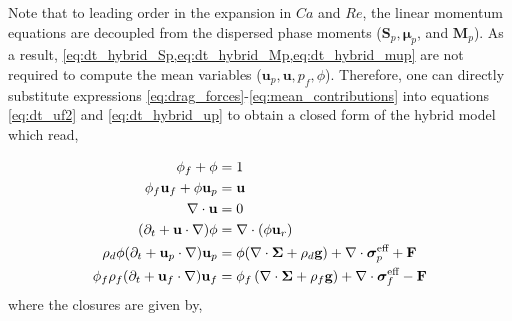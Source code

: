 Note that to leading order in the expansion in $Ca$ and $Re$, the linear momentum equations are decoupled from the dispersed phase moments ($\textbf{S}_p, \bm{\mu}_p$, and $\textbf{M}_p$).
As a result, \ref{eq:dt_hybrid_Sp,eq:dt_hybrid_Mp,eq:dt_hybrid_mup} are not required to compute the mean variables ($\textbf{u}_p, \textbf{u}, p_f, \phi$).
Therefore, one can directly substitute expressions \ref{eq:drag_forces}-\ref{eq:mean_contributions} into equations \ref{eq:dt_uf2} and \ref{eq:dt_hybrid_up} to obtain a closed form of the hybrid model which read,

\begin{align}
    \label{eq:firstSys}
    \phi_f + \phi &= 1\\
    \phi_f\textbf{u}_f + 
    \phi\textbf{u}_p&=\textbf{u}\\
    \div \textbf{u} &= 0\\
    (\pddt + \textbf{u} \cdot \grad)\phi
    &=
    \div (\phi \textbf{u}_r)\\
    \rho_d \phi (\pddt + \textbf{u}_p \cdot \grad)\textbf{u}_p
    &=
    \phi(\div \bm\Sigma
    + \rho_d  \textbf{g})
    + \div \bm\sigma_p^\text{eff}
    + \textbf{F}
    \\
    \phi_f \rho_f(\pddt + \textbf{u}_f  \cdot \grad) \textbf{u}_f
    &= \phi_f 
    \left(\div \bm\Sigma
    + \rho_f \textbf{g}\right)
    + \div \bm\sigma_f^\text{eff}
    -\textbf{F}
    \label{eq:lastSys}
\end{align}
where the closures are given by,
